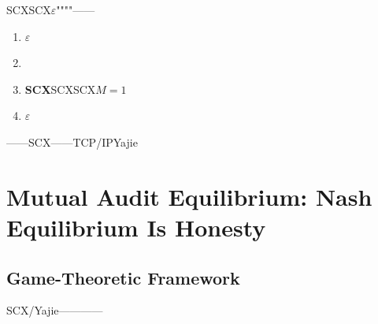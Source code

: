 \documentclass[12pt,a4paper]{article}
\theoremstyle{remark}
\begin{document}
SCXSCX$\varepsilon$""""——


\begin{enumerate}[label=(\arabic*)]
    \item \textbf{}$\varepsilon$
    \item \textbf{}
    \item \textbf{SCX}SCXSCX$M=1$
    \item \textbf{$\varepsilon$}
\end{enumerate}

——\textbf{}SCX——TCP/IPYajie


\section{}
\section{Mutual Audit Equilibrium: Nash Equilibrium Is Honesty}

\subsection{}
\subsection{Game-Theoretic Framework}

SCX/Yajie————
\end{document}

